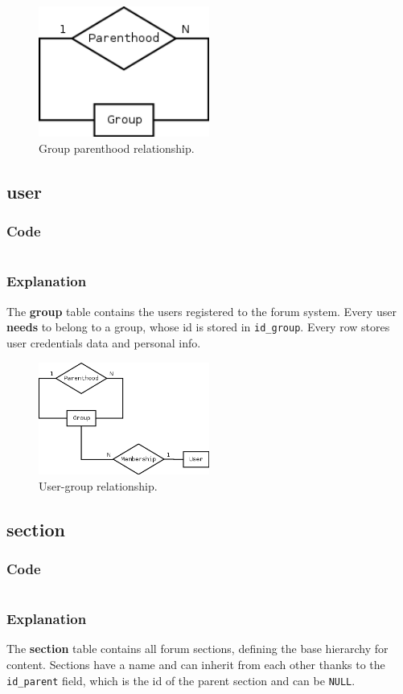 \documentclass[12pt]{report}
\renewcommand\emph{\textbf}
\newcommand{\printSQLtest}[1]
{
    \inputminted[linenos, breaklines, breakbytoken, tabsize=4, fontsize=\footnotesize]{mysql}{#1}
}
\newcommand{\printSQLTablepage}[2]
{    
    \subsection{#2}
    \subsubsection{Code}
    \printSQLtest{../sql/parts/#1}
    \subsubsection{Explanation}
}
\begin{document}
                    \begin{figure}[!htb]
                    \caption{Group parenthood relationship.}
                    \centering
                    \includegraphics[width=0.5\textwidth]{td/03group}
                    \end{figure}

                \newpage

                \printSQLTablepage{04_tblUser.sql}{user}
                    The \emph{group} table contains the users registered to the forum system. Every user \emph{needs} to belong to a group, whose id is stored in \texttt{id_group}.
                    Every row stores user credentials data and personal info.

                    \begin{figure}[!htb]
                    \caption{User-group relationship.}
                    \centering
                    \includegraphics[width=0.5\textwidth]{td/04user}
                    \end{figure}

                \newpage

                \printSQLTablepage{05_tblSection.sql}{section}
                    The \emph{section} table contains all forum sections, defining the base hierarchy for content. Sections have a name and can inherit from each other thanks to the \texttt{id_parent} field, which is the id of the parent section and can be \texttt{NULL}.
\end{document}
